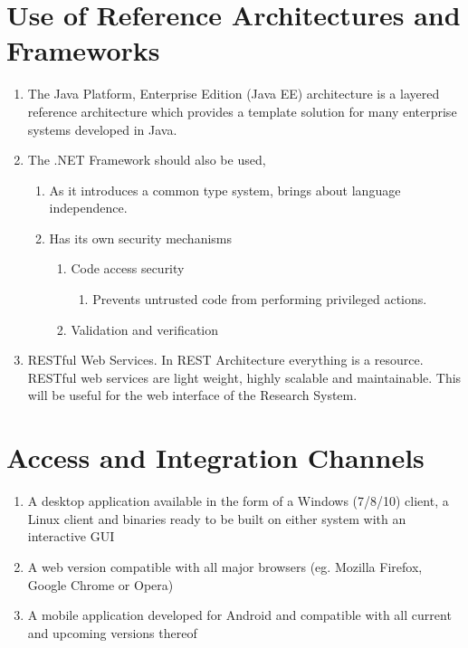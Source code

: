 \documentclass[hidelinks,a4paper,12pt]{article}
\begin{document}
\section{Use of Reference Architectures and Frameworks}
\begin{enumerate}
	\item  The Java Platform, Enterprise Edition (Java EE) architecture is a layered reference architecture which provides a template solution for many enterprise systems developed in Java.
	\item  The .NET Framework should also be used, 
	\begin{enumerate}
		\item  As it introduces a common type system, brings about language independence.
		\item  Has its own security mechanisms
		\begin{enumerate}
			\item  Code access security
			\begin{enumerate}
				\item  Prevents untrusted code from performing privileged actions.
			\end{enumerate}
			\item  Validation and verification
		\end{enumerate}
	\end{enumerate}
	\item  RESTful Web Services. In REST Architecture everything is a resource. RESTful web services are light weight, highly scalable and maintainable. This will be useful for the web interface of the Research System.
\end{enumerate}
		
		
		
		
\section{Access and Integration Channels}
	\begin{enumerate}
		\item A desktop application available in the form of a Windows (7/8/10) client, a Linux client and binaries
		ready to be built on either system with an interactive GUI
		\item A web version compatible with all major browsers (eg. Mozilla Firefox, Google Chrome or Opera)
		\item A mobile application developed for Android and compatible with all current and upcoming versions thereof
	\end{enumerate}
	
\end{document}
